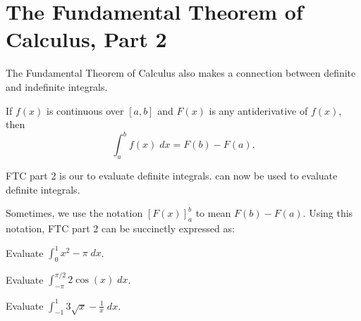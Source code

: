 \documentclass[../main.tex]{subfiles}
\begin{document}
 \section{The Fundamental Theorem of Calculus, Part 2}
  The Fundamental Theorem of Calculus also makes a connection between definite and indefinite integrals.

  \begin{mdframed}[style=withref-compact]
    If \(f(x)\) is continuous over \([a,b]\) and \(F(x)\) is any antiderivative of \(f(x)\), then 
    \[
      \int_{a}^{b} f(x) \;dx = F(b) - F(a).
    \]

  \end{mdframed}

  FTC part 2 is our  to evaluate definite integrals.  can now be used to evaluate definite integrals.

  Sometimes, we use the notation \([F(x)]_{a}^{b}\) to mean \(F(b) - F(a)\). Using this notation, FTC part 2 can be succinctly expressed as:

  \begin{example}
    Evaluate \(\int_{0}^{1} x^{2} - \pi \;dx\).
  \end{example}
  \clearpage

  \begin{example}
    Evaluate \(\int_{-\pi}^{\pi/2} 2\cos(x) \;dx\).
  \end{example}

  \begin{example}
    Evaluate \(\int_{-1}^{1} 3 \sqrt{x} - \frac{1}{x} \;dx\).
  \end{example}
\end{document}
